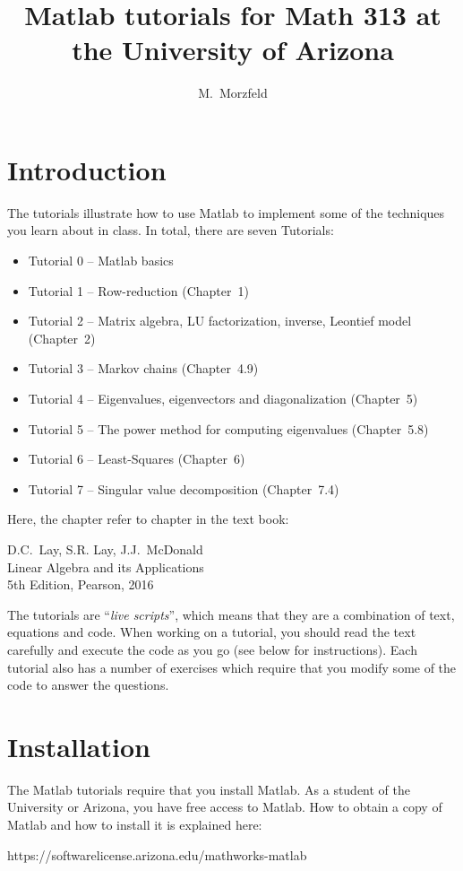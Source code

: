 \documentclass[11pt]{article}
\begin{document}
\title{Matlab tutorials for Math 313 at the University of Arizona}
\author{M.~Morzfeld}
\maketitle

\section{Introduction}
The tutorials illustrate how to use Matlab to
implement some of the techniques you learn about in class.
In total, there are seven Tutorials:
\begin{itemize}
	\item
	Tutorial 0 -- Matlab basics
	\item
	Tutorial 1 -- Row-reduction 
	(Chapter~1)
	\item
	Tutorial 2 -- Matrix algebra, LU factorization, inverse, Leontief model
	 (Chapter~2) 
	\item
	Tutorial 3 -- Markov chains
	(Chapter~4.9)
	\item
	Tutorial 4 -- Eigenvalues, eigenvectors and diagonalization
	(Chapter~5)
	\item
	Tutorial 5 -- The power method for computing eigenvalues
	(Chapter~5.8)
	\item
	Tutorial 6 -- Least-Squares
	(Chapter~6)
	\item
	Tutorial 7 -- Singular value decomposition
	(Chapter~7.4)
\end{itemize}
\noindent
Here, the chapter refer to chapter in the text book:
\begin{center}
	D.C.~Lay, S.R. Lay, J.J.~McDonald\\
	Linear Algebra and its Applications	\\
	5th Edition, Pearson, 2016 
\end{center}

\noindent
The tutorials are ``\emph{live scripts}'', 
which means that they are a combination of text, equations and code.
When working on a tutorial, you should read the text carefully 
and execute the code as you go (see below for instructions).
Each tutorial also has a number of exercises which require
that you modify some of the code to answer the questions.

\section{Installation}
The Matlab tutorials require that you install Matlab.
As a student of the University or Arizona, 
you have free access to Matlab.
How to obtain a copy of Matlab and how to install it
is explained here:
\begin{center}
https://softwarelicense.arizona.edu/mathworks-matlab
\end{center}
\end{document}
